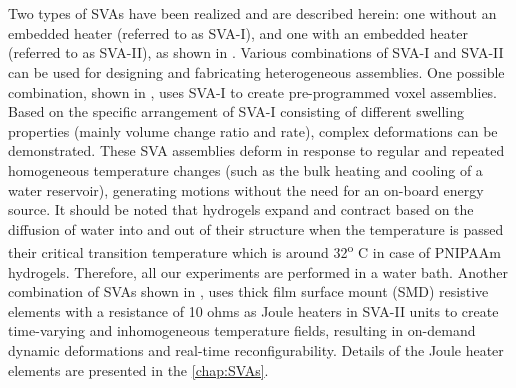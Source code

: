 \section{}
Two types of SVAs have been realized and are described herein: one without an embedded heater (referred to as SVA-I), and one with an embedded heater (referred to as SVA-II), as shown in . 
Various combinations of SVA-I and SVA-II can be used for designing and fabricating heterogeneous assemblies. 
One possible combination, shown in , uses SVA-I to create pre-programmed voxel assemblies. Based on the specific arrangement of SVA-I consisting of different swelling properties (mainly volume change ratio and rate), complex deformations can be demonstrated. These SVA assemblies deform in response to regular and repeated homogeneous temperature changes (such as the bulk heating and cooling of a water reservoir), generating motions without the need for an on-board energy source. It should be noted that hydrogels expand and contract based on the diffusion of water into and out of their structure when the temperature is passed their critical transition temperature which is around 32\textsuperscript{o} C in case of PNIPAAm hydrogels. Therefore, all our experiments are performed in a water bath. Another combination of SVAs shown in , uses thick film surface mount (SMD) resistive elements with a resistance of 10 ohms as Joule heaters in SVA-II units to create time-varying and inhomogeneous temperature fields, resulting in on-demand dynamic deformations and real-time reconfigurability. Details of the Joule heater elements are presented in the \ref{chap:SVAs}.\\ 


